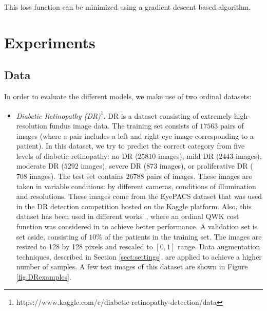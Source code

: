 \documentclass[journal]{IEEEtran}
\begin{document}
	This loss function can be minimized using a gradient descent based algorithm.
	
	\section{Experiments}
	\label{sect:experiments}
	\subsection{Data}
	In order to evaluate the different models, we make use of two ordinal datasets:
	
	\begin{itemize}
		\item \textit{Diabetic Retinopathy (DR)}\footnote{https://www.kaggle.com/c/diabetic-retinopathy-detection/data}. DR is a dataset consisting of extremely high-resolution fundus image data. The training set consists of $17563$ pairs of images (where a  pair includes a left and right eye image corresponding to a patient). In this dataset, we try to predict the correct category from five levels of diabetic retinopathy: no DR ($25810$ images), mild DR ($2443$ images), moderate DR ($5292$ images), severe DR ($873$ images), or proliferative DR ($708$ images). The test set contains $26788$ pairs of images. These images are taken in variable conditions: by different cameras,  conditions of illumination and resolutions. These images come from the EyePACS dataset that was used in the DR detection competition hosted on the Kaggle platform. Also, this dataset has been used in different works~\cite{de2018weighted,nebot2016diabetic}, where an ordinal QWK cost function was considered in \cite{de2018weighted} to achieve better performance. A validation set is set aside, consisting of $10\%$ of the patients in the training set. The images are resized to 128 by 128 pixels and rescaled to $[0,1]$ range. Data augmentation techniques, described in Section \ref{sect:settings}, are applied to achieve a higher number of samples. A few test images of this dataset are shown in Figure \ref{fig:DRexamples}.
		

\end{itemize}
\end{document}

